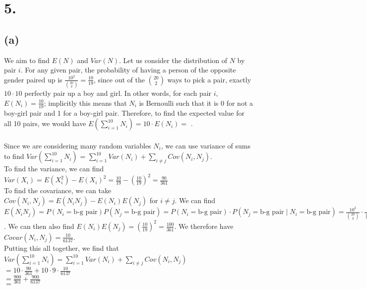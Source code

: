 \documentclass{article}
\begin{document}
\section*{5.}
{\Large 

\subsection*{(a)}
We aim to find $E(N)$ and $Var(N)$. Let us consider the distribution of $N$ by pair $i$. For any given pair, the probability of having a person of the opposite gender paired up is $\frac{10^2}{\binom{20}{2}} = \frac{10}{19}$, since out of the $\binom{20}{2}$ ways to pick a pair, exactly $10 \cdot 10$ perfectly pair up a boy and girl. In other words, for each pair $i$, $E(N_i) = \frac{10}{19}$; implicitly this means that $N_i$ is Bernoulli such that it is 0 for not a boy-girl pair and 1 for a boy-girl pair. Therefore, to find the expected value for all 10 pairs, we would have $E(\sum_{i=1}^{10}N_i) = 10 \cdot E(N_i) =$ . \\ \\
Since we are considering many random variables $N_i$, we can use variance of sums to find $Var(\sum_{i=1}^{10}N_i)$ = $\sum_{i=1}^{10} Var(N_i) + \sum_{i \neq j}Cov(N_i, N_j)$. \\
To find the variance, we can find $Var(X_i) = E(X_i^2) - E(X_i)^2 = \frac{10}{19} - (\frac{10}{19})^2 = \frac{90}{361}$ \\
To find the covariance, we can take $Cov(N_i, N_j) = E(N_iN_j) - E(N_i)E(N_j)$ for $i \neq j$. We can find $E(N_iN_j) = P(N_i = \text{b-g pair})P(N_j = \text{b-g pair}) = P(N_i = \text{b-g pair}) \cdot P(N_j = \text{b-g pair} \mid N_i = \text{b-g pair}) = \frac{10^2}{\binom{20}{2}} \cdot \frac{9^2}{\binom{18}{2}} = \frac{10}{19} \cdot \frac{9}{17} = \frac{90}{323}$. We can then also find $E(N_i)E(N_j) = (\frac{10}{19})^2 = \frac{100}{361}$. We therefore have $Covar(N_i, N_j) = \frac{10}{6137}$. \\ 
Putting this all together, we find that \\
$Var(\sum_{i=1}^{10}N_i) = \sum_{i=1}^{10} Var(N_i) + \sum_{i \neq j}Cov(N_i, N_j)$ \\ 
$= 10 \cdot \frac{90}{361} + 10 \cdot 9 \cdot \frac{10}{6137}$ \\ 
$= \frac{900}{361} + \frac{900}{6137}$ \\
$= $ 

}
\end{document}
